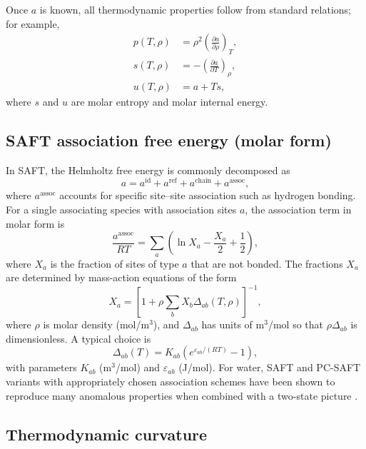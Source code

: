 \documentclass[12pt]{article}
\begin{document}
Once $a$ is known, all thermodynamic properties follow from standard relations; for example,
\begin{align}
  p(T,\rho)&=\rho^2\left(\frac{\partial a}{\partial \rho}\right)_T,\\
  s(T,\rho)&=-\left(\frac{\partial a}{\partial T}\right)_\rho,\\
  u(T,\rho)&=a+Ts,
\end{align}
where $s$ and $u$ are molar entropy and molar internal energy.

\subsection{SAFT association free energy (molar form)}

In SAFT, the Helmholtz free energy is commonly decomposed as \cite{Chapman1989,Chapman1988}
\begin{equation}
  a=a^{\mathrm{id}}+a^{\mathrm{ref}}+a^{\mathrm{chain}}+a^{\mathrm{assoc}},
\end{equation}
where $a^{\mathrm{assoc}}$ accounts for specific site--site association such as hydrogen bonding. For a single associating species with association sites $a$, the association term in molar form is
\begin{equation}
  \frac{a^{\mathrm{assoc}}}{RT}=\sum_a\left(\ln X_a-\frac{X_a}{2}+\frac{1}{2}\right),
\end{equation}
where $X_a$ is the fraction of sites of type $a$ that are not bonded. The fractions $X_a$ are determined by mass-action equations of the form
\begin{equation}
  X_a=\left[1+\rho\sum_b X_b\Delta_{ab}(T,\rho)\right]^{-1},
\end{equation}
where $\rho$ is molar density (mol/m$^3$), and $\Delta_{ab}$ has units of m$^3$/mol so that $\rho\Delta_{ab}$ is dimensionless. A typical choice is
\begin{equation}
  \Delta_{ab}(T)=K_{ab}\left(e^{\varepsilon_{ab}/(RT)}-1\right),
\end{equation}
with parameters $K_{ab}$ (m$^3$/mol) and $\varepsilon_{ab}$ (J/mol). For water, SAFT and PC-SAFT variants with appropriately chosen association schemes have been shown to reproduce many anomalous properties when combined with a two-state picture \cite{Novak2024,Novak2025,Marshall2021,Liang2014}.

\subsection{Thermodynamic curvature}
\end{document}
